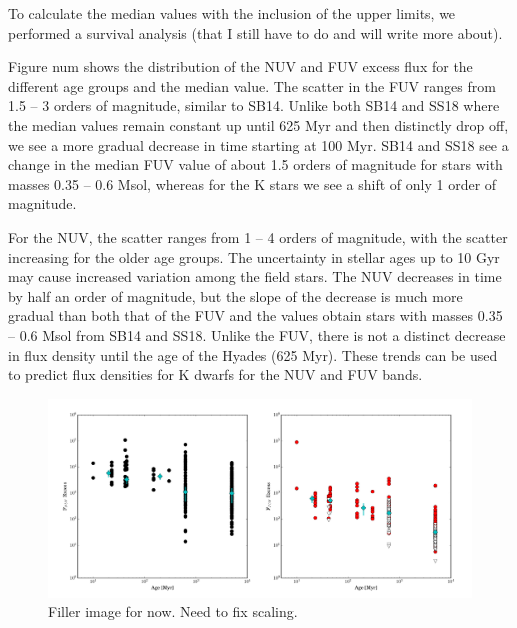 \documentclass[twocolumn]{aastex62}
\begin{document}
To calculate the median values with the inclusion of the upper limits, we performed a survival analysis (that I still have to do and will write more about). 

Figure num shows the distribution of the NUV and FUV excess flux for the different age groups and the median value. The scatter in the FUV ranges from 1.5 – 3 orders of magnitude, similar to SB14. Unlike both SB14 and SS18 where the median values remain constant up until 625 Myr and then distinctly drop off, we see a more gradual decrease in time starting at 100 Myr. SB14 and SS18 see a change in the median FUV value of about 1.5 orders of magnitude for stars with masses 0.35 – 0.6 Msol, whereas for the K stars we see a shift of only 1 order of magnitude. 

For the NUV, the scatter ranges from 1 – 4 orders of magnitude, with the scatter increasing for the older age groups. The uncertainty in stellar ages up to 10 Gyr may cause increased variation among the field stars. The NUV decreases in time by half an order of magnitude, but the slope of the decrease is much more gradual than both that of the FUV and the values obtain stars with masses 0.35 – 0.6 Msol from SB14 and SS18. Unlike the FUV, there is not a distinct decrease in flux density until the age of the Hyades (625 Myr). These trends can be used to predict flux densities for K dwarfs for the NUV and FUV bands. 


\begin{figure}[t]
\centering
\includegraphics[width=\linewidth]{ffdensity_age_NO_J.pdf}
\caption{Filler image for now. Need to fix scaling. \label{fig:ffdensity_age}}
\end{figure}


\end{document}
